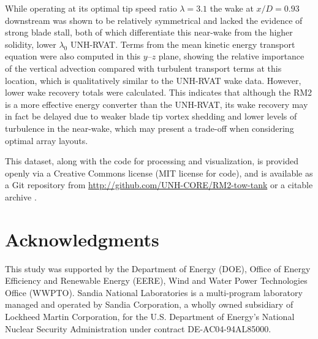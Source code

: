 While operating at its optimal tip speed ratio $\lambda=3.1$ the wake at
$x/D=0.93$ downstream was shown to be relatively symmetrical and lacked the
evidence of strong blade stall, both of which differentiate this near-wake from
the higher solidity, lower $\lambda_0$ UNH-RVAT. Terms from the mean kinetic
energy transport equation were also computed in this $y$--$z$ plane, showing the
relative importance of the vertical advection compared with turbulent transport
terms at this location, which is qualitatively similar to the UNH-RVAT wake
data. However, lower wake recovery totals were calculated. This indicates that
although the RM2 is a more effective energy converter than the UNH-RVAT, its
wake recovery may in fact be delayed due to weaker blade tip vortex shedding and
lower levels of turbulence in the near-wake, which may present a trade-off when
considering optimal array layouts.

This dataset, along with the code for processing and visualization, is provided
openly via a Creative Commons license (MIT license for code), and is available
as a Git repository from \url{http://github.com/UNH-CORE/RM2-tow-tank} or a
citable archive \cite{Bachant2016-RM2-data}.


\section{Acknowledgments}

This study was supported by the Department of Energy (DOE), Office of Energy
Efficiency and Renewable Energy (EERE), Wind and Water Power Technologies Office
(WWPTO). Sandia National Laboratories is a multi-program laboratory managed and
operated by Sandia Corporation, a wholly owned subsidiary of Lockheed Martin
Corporation, for the U.S. Department of Energy's National Nuclear Security
Administration under contract DE-AC04-94AL85000.

